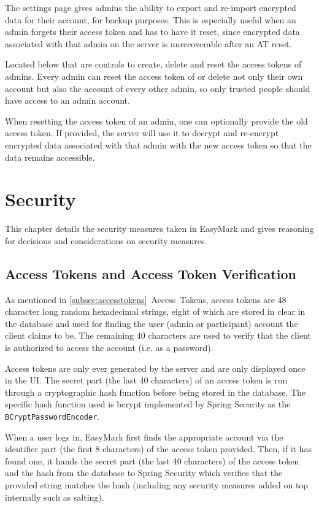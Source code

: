 \documentclass[12pt,a4paper,oneside]{report}
\begin{document}
	The settings page gives admins the ability to export and re-import encrypted data for their account, for backup purposes. This is especially useful when an admin forgets their access token and has to have it reset, since encrypted data associated with that admin on the server is unrecoverable after an AT reset.

	Located below that are controls to create, delete and reset the access tokens of admins. Every admin can reset the access token of or delete not only their own account but also the account of every other admin, so only trusted people should have access to an admin account.

	When resetting the access token of an admin, one can optionally provide the old access token. If provided, the server will use it to decrypt and re-encrypt encrypted data associated with that admin with the new access token so that the data remains accessible.

	\section{Security}
	This chapter details the security measures taken in EasyMark and gives reasoning for decisions and considerations on security measures.

	\subsection{Access Tokens and Access Token Verification}
	As mentioned in \ref{subsec:accesstokens}~Access~Tokens, access tokens are 48 character long random hexadecimal strings, eight of which are stored in clear in the database and used for finding the user (admin or participant) account the client claims to be. The remaining 40 characters are used to verify that the client is authorized to access the account (i.e. as a password).

	Access tokens are only ever generated by the server and are only displayed once in the UI. The secret part (the last 40 characters) of an access token is run through a cryptographic hash function before being stored in the database. The specific hash function used is bcrypt implemented by Spring Security as the \lstinline|BCryptPasswordEncoder|.

	When a user logs in, EasyMark first finds the appropriate account via the identifier part (the first 8 characters) of the access token provided. Then, if it has found one, it hands the secret part (the last 40 characters) of the access token and the hash from the database to Spring Security which verifies that the provided string matches the hash (including any security measures added on top internally such as salting).
\end{document}
